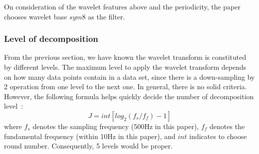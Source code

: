 On consideration of the wavelet features above and the periodicity,
the paper chooses wavelet base $sym8$ as the filter. 

\subsubsection{Level of decomposition}
From the previous section, we have known the wavelet transform is
constituted by different levels. The maximum level to apply the
wavelet transform depends on how
many data points contain in a data set, since there is a down-sampling by 2 operation
from one level to the next one. In general, there is no solid criteria.
However, the following formula helps quickly decide the
number of decomposition level~\cite{liu2004compression}:
\begin{equation}
    J=int[log_2(f_s / f_f) -1]
    \label{waveletlevel}
\end{equation}
where $f_s$ denotes the sampling frequency (500Hz in this paper),  
$f_f$ denotes the fundamental frequency (within 10Hz in this paper),
and $int$ indicates to choose round number. Consequently, 5 levels
would be proper. 

